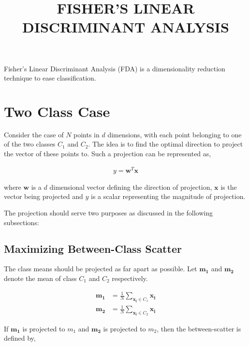 \documentclass[11pt, a4paper]{article}
\begin{document}
\title{FISHER'S LINEAR DISCRIMINANT ANALYSIS}
\date{}
\maketitle

Fisher's Linear Discriminant Analysis (FDA) is a dimensionality reduction technique to ease classification.

\section{Two Class Case}

Consider the case of $N$ points in $d$ dimensions, with each point belonging to one of the two classes $C_1$ and $C_2$. The idea is to find the optimal direction to project the vector of these points to. Such a projection can be represented as,

\begin{align*}
	y = \boldsymbol{w}^T\boldsymbol{x} 
\end{align*}

where $\boldsymbol{w}$ is a $d$ dimensional vector defining the direction of projection, $\boldsymbol{x}$ is the vector being projected and $y$ is a scalar representing the magnitude of projection.

The projection should serve two purposes as discussed in the following subsections:

\subsection{Maximizing Between-Class Scatter}

The class means should be projected as far apart as possible. Let $\boldsymbol{m_1}$ and $\boldsymbol{m_2}$ denote the mean of class $C_1$ and $C_2$ respectively.

\begin{align*}
	\boldsymbol{m_1} & = \frac{1}{N} \sum_{\boldsymbol{x_i} \in C_1} \boldsymbol{x_i} \\
	\boldsymbol{m_2} & = \frac{1}{N} \sum_{\boldsymbol{x_i} \in C_2} \boldsymbol{x_i} 
\end{align*} 


If $\boldsymbol{m_1}$ is projected to $m_1$ and $\boldsymbol{m_2}$ is projected to $m_2$, then the between-scatter is defined by,
\end{document}

